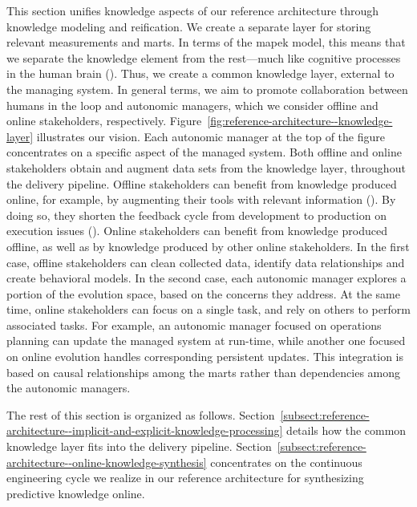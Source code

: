 This section unifies knowledge aspects of our reference architecture through knowledge modeling and reification. We create a separate layer for storing relevant measurements and \glspl{mart}. In terms of the \gls{mapek} model, this means that we separate the knowledge element from the rest---much like cognitive processes in the human brain (). Thus, we create a common knowledge layer, external to the managing system. In general terms, we aim to promote collaboration between humans in the loop and autonomic managers, which we consider offline and online stakeholders, respectively. Figure~\ref{fig:reference-architecture--knowledge-layer} illustrates our vision. Each autonomic manager at the top of the figure concentrates on a specific aspect of the managed system. Both offline and online stakeholders obtain and augment data sets from the knowledge layer, throughout the delivery pipeline. Offline stakeholders can benefit from knowledge produced online, for example, by augmenting their tools with relevant information (). By doing so, they shorten the feedback cycle from development to production on execution issues (). Online stakeholders can benefit from knowledge produced offline, as well as by knowledge produced by other online stakeholders. In the first case, offline stakeholders can clean collected data, identify data relationships and create behavioral models. In the second case, each autonomic manager explores a portion of the evolution space, based on the concerns they address. At the same time, online stakeholders can focus on a single task, and rely on others to perform associated tasks. For example, an autonomic manager focused on operations planning can update the managed system at run-time, while another one focused on online evolution handles corresponding persistent updates. This integration is based on causal relationships among the \glspl{mart} rather than dependencies among the autonomic managers.%

The rest of this section is organized as follows. Section~\ref{subsect:reference-architecture--implicit-and-explicit-knowledge-processing} details how the common knowledge layer fits into the delivery pipeline. Section~\ref{subsect:reference-architecture--online-knowledge-synthesis} concentrates on the continuous engineering cycle we realize in our reference architecture for synthesizing predictive knowledge online.



